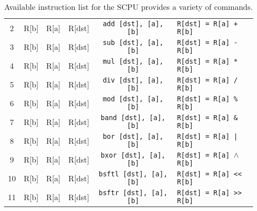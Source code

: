 \documentclass{article}
\begin{document}
\begin{table}[h!]
\begin{footnotesize}
\begin{tabular}{cccc|c|l}
			2 & R[b] & R[a] & R[dst] & \texttt{add [dst], [a], [b]} & \texttt{R[dst] = R[a] + R[b]} \\
			3 & R[b] & R[a] & R[dst] & \texttt{sub [dst], [a], [b]} & \texttt{R[dst] = R[a] - R[b]} \\
			4 & R[b] & R[a] & R[dst] & \texttt{mul [dst], [a], [b]} & \texttt{R[dst] = R[a] * R[b]} \\
			5 & R[b] & R[a] & R[dst] & \texttt{div [dst], [a], [b]} & \texttt{R[dst] = R[a] / R[b]} \\
			6 & R[b] & R[a] & R[dst] & \texttt{mod [dst], [a], [b]} & \texttt{R[dst] = R[a] \% R[b]} \\
			7 & R[b] & R[a] & R[dst] & \texttt{band [dst], [a], [b]} & \texttt{R[dst] = R[a] \& R[b]} \\
			8 & R[b] & R[a] & R[dst] & \texttt{bor [dst], [a], [b]} & \texttt{R[dst] = R[a] | R[b]} \\
			9 & R[b] & R[a] & R[dst] & \texttt{bxor [dst], [a], [b]} & \texttt{R[dst] = R[a] $\wedge$ R[b]} \\
			10 & R[b] & R[a] & R[dst] & \texttt{bsftl [dst], [a], [b]} & \texttt{R[dst] = R[a] << R[b]} \\
			11 & R[b] & R[a] & R[dst] & \texttt{bsftr [dst], [a], [b]} & \texttt{R[dst] = R[a] >> R[b]} \\
			\hline
		\end{tabular}
	\end{footnotesize}
	\caption{Available instruction list for the SCPU provides a variety of commands.}
	\label{table:instruction-table}
\end{table}
\end{document}
